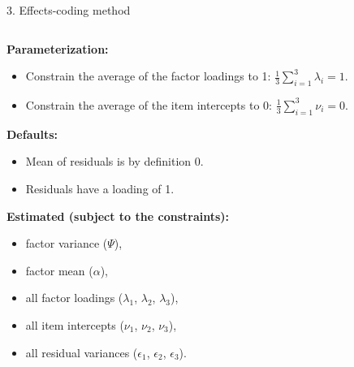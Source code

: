 \documentclass[10pt]{beamer}\usepackage[]{graphicx}\usepackage[]{xcolor}
\begin{document}
\begin{frame}{3. Effects-coding method}

    \begin{columns}[T] %
    \begin{column}{.65\textwidth}
    
    \textbf{Parameterization:}
        \begin{itemize}
            \item Constrain the average of the factor loadings to 1:
            $\frac{1}{3} \sum_{i=1}^3 \lambda_i = 1$. %
            \item Constrain the average of the item intercepts to 0:
            $\frac{1}{3} \sum_{i=1}^3 \nu_i = 0$.
        \end{itemize} 
        \textbf{Defaults:}
        \begin{itemize}
            \item Mean of residuals is by definition 0.
            \item Residuals have a loading of 1.
        \end{itemize} 
        \textbf{Estimated (subject to the constraints):}
        \begin{itemize}
            \item factor variance ($\Psi$),
            \item factor mean ($\alpha$),
            \item all factor loadings ($\lambda_1$, $\lambda_2$, $\lambda_3$),
            \item all item intercepts ($\nu_1$, $\nu_2$, $\nu_3$), 
            \item all residual variances ($\epsilon_1$, $\epsilon_2$, $\epsilon_3$).
        \end{itemize}
    
    \end{column}%
    

\end{columns}
\end{frame}
\end{document}
